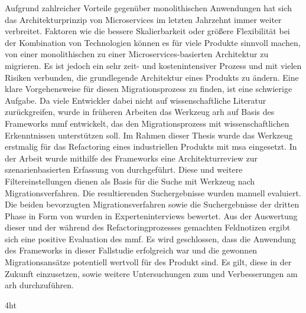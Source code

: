 \documentclass[
  ngerman,
  a4paper,  %
  twoside,  %
  bibliography=totoc,
  headsepline,
  cleardoublepage=empty,
  parskip=half,
  draft=false
]{scrbook}
\begin{document}
Aufgrund zahlreicher Vorteile gegenüber monolithischen Anwendungen hat sich das Ar\-chi\-tek\-tur\-prin\-zip von Microservices im letzten Jahrzehnt immer weiter verbreitet.
Faktoren wie die bes\-sere Skalierbarkeit oder größere Flexibilität bei der Kombination von Technologien können es für viele Produkte sinnvoll machen, von einer monolithischen zu einer Microservices-basierten Architektur zu migrieren.
Es ist jedoch ein sehr zeit- und kostenintensiver Prozess und mit vielen Risiken verbunden, die grundlegende Architektur eines Produkts zu ändern.
Eine klare Vorgehensweise für diesen Migrationsprozess zu finden, ist eine schwierige Aufgabe.
Da viele Entwickler dabei nicht auf wissenschaftliche Literatur zurückgreifen, wurde in früheren Arbeiten das Werkzeug \acrfull{arh} auf Basis des Frameworks \acrfull{mmf} entwickelt, das den Migrationsprozess mit wissenschaftlichen Erkenntnissen unterstützen soll.
Im Rahmen dieser Thesis wurde das Werkzeug erstmalig für das Refactoring eines industriellen Produkts mit \acrlong{msa} eingesetzt.
In der Arbeit wurde mithilfe des Frameworks eine Architekturreview zur szenarienbasierten Erfassung von  durchgeführt.
Diese und weitere Filtereinstellungen dienen als Basis für die Suche mit Werkzeug nach Migrationsverfahren.
Die resultierenden Suchergebnisse wurden manuell evaluiert.
Die beiden bevorzugten Migrationsverfahren sowie die Suchergebnisse der dritten Phase in Form von \bpp wurden in Experteninterviews bewertet.
Aus der Auswertung dieser und der während des Refactoringprozesses gemachten Feldnotizen ergibt sich eine positive Evaluation des \acrshort{mmf}.
Es wird geschlossen, dass die Anwendung des Frameworks in dieser Fallstudie erfolgreich war und die gewonnen Migrationsansätze potentiell wertvoll für des Produkt sind.
Es gilt, diese in der Zukunft einzusetzen, sowie weitere Untersuchungen zum und Verbesserungen am \acrshort{arh} durchzuführen.


\cleardoublepage



\iftex4ht
\else
\fi

%
%
\end{document}
